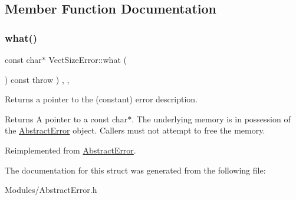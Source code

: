 \subsection{Member Function Documentation}
\mbox{\label{structVectSizeError_af92248320a9fb06b025662736a742c9e}} 
\subsubsection{\texorpdfstring{what()}{what()}}
{\footnotesize\ttfamily const char$\ast$ Vect\+Size\+Error\+::what (\begin{DoxyParamCaption}{ }\end{DoxyParamCaption}) const throw  ) \hspace{0.3cm}{\ttfamily [inline]}, {\ttfamily [override]}, {\ttfamily [virtual]}}

Returns a pointer to the (constant) error description. \begin{DoxyReturn}{Returns}
A pointer to a const char$\ast$. The underlying memory is in possession of the \hyperlink{classAbstractError}{Abstract\+Error} object. Callers must not attempt to free the memory. 
\end{DoxyReturn}


Reimplemented from \hyperlink{classAbstractError_a19735c7a9b5f6e84db606292967667a9}{Abstract\+Error}.



The documentation for this struct was generated from the following file\+:\begin{DoxyCompactItemize}
\item 
Modules/Abstract\+Error.\+h\end{DoxyCompactItemize}
